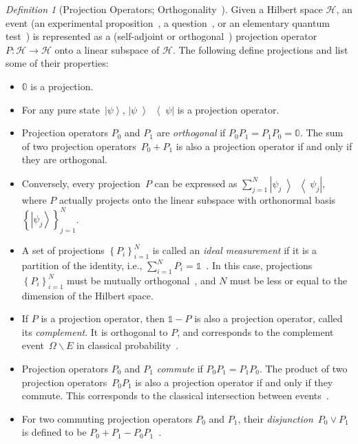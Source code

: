 \documentclass{article}
\theoremstyle{remark}
\newtheorem{definition}{Definition}
\newcommand{\Hilb}{\mathcal{H}}
\newcommand{\ket}[1]{{\left\vert{#1}\right\rangle}}
\newcommand{\op}[2]{\ensuremath{\left\vert{#1}\middle\rangle\middle\langle{#2}\right\vert}}
\newcommand{\proj}[1]{\op{#1}{#1}}
\begin{document}
\begin{definition}[Projection Operators; Orthogonality~\cite{10.2307/2308516,Redhead1987-REDINA,peres1995quantum,Griffiths2003,Swart2013}]
  \label{def:Projection} Given a Hilbert space $\Hilb$, an event (an
  experimental proposition~\cite{BirkhoffVonNeumann1936}, a
  question~\cite{10.2307/2308516,Abramsky2012},
  or an elementary quantum test~\cite{peres1995quantum}) is represented
  as a (self-adjoint or orthogonal~\cite {Griffiths2003,Maassen2010})
  projection operator $P:\Hilb\rightarrow\Hilb$ onto a linear subspace
  of $\Hilb$. The following define projections and list some of their properties:
\begin{itemize}
\item $\mathbb{0}$ is a projection. 
\item For any pure state~$\ket{\psi}$, $\proj{\psi}$ is a projection
operator. 
\item Projection operators $P_{0}$ and $P_{1}$ are \emph{orthogonal}
  if $P_{0}P_{1}=P_{1}P_{0}=\mathbb{0}$. The sum of two projection
  operators~$P_{0}+P_{1}$ is also a projection operator if and only if
  they are orthogonal.
\item Conversely, every projection~$P$ can be expressed as
  $\sum_{j=1}^{N}\proj{\psi_{j}}$, where $P$ actually projects onto
  the linear subspace with orthonormal
  basis~$\left\{ \ket{\psi_{j}}\right\} _{j=1}^{N}$.
\item A set of projections $\left\{ P_{i}\right\} _{i=1}^{N}$ is
  called an \emph{ideal measurement} if it is a partition of the
  identity, i.e., $\sum_{i=1}^{N}P_{i}=\mathbb{1}$~\cite{Swart2013}.
  In this case, projections $\left\{ P_{i}\right\} _{i=1}^{N}$ must
  be mutually orthogonal~\cite{Griffiths2003,Halmos1957}, and $N$ must be less
  or equal to the dimension of the Hilbert space.
\item If $P$ is a projection operator, then $\mathbb{1}-P$ is also a
  projection operator, called its \emph{complement}. It is orthogonal to
  $P$, and corresponds to the complement event~$\Omega\backslash E$ in
  classical probability~\cite{Griffiths2003}.
\item Projection operators $P_{0}$ and $P_{1}$ \emph{commute} if $P_{0}P_{1}=P_{1}P_{0}$.
The product of two projection operators~$P_{0}P_{1}$ is also a projection
operator if and only if they commute. This corresponds to the classical
intersection between events~\cite{peres1995quantum,Griffiths2003}. 
\item For two commuting projection operators $P_{0}$ and $P_{1}$,
  their \emph{disjunction}~$P_{0}\vee P_{1}$ is defined to be
  $P_{0}+P_{1}-P_{0}P_{1}$~\cite{Griffiths2003}.
\end{itemize}
\end{definition}
\end{document}
